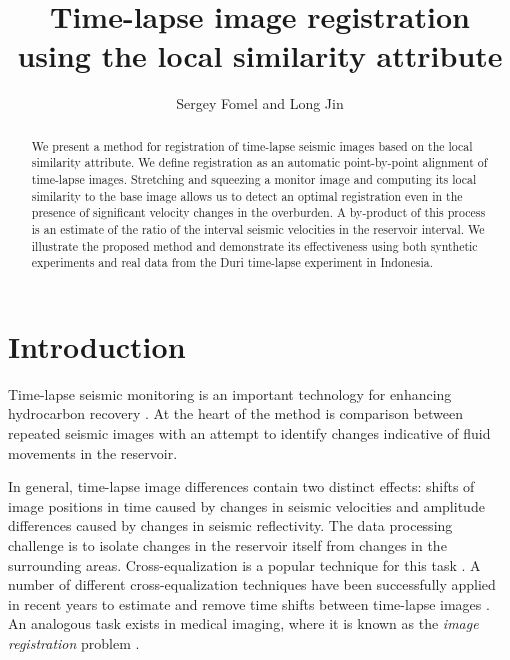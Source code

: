 \title{Time-lapse image registration using the local similarity attribute}
\author{Sergey Fomel and Long Jin}


\address{
John A. and Katherine G. Jackson School of Geosciences \\
The University of Texas at Austin \\
University Station, Box X \\
Austin, TX 78713-8924}


\maketitle

\begin{abstract}
  We present a method for registration of time-lapse seismic images
  based on the local similarity attribute. We define registration as
  an automatic point-by-point alignment of time-lapse images.
  Stretching and squeezing a monitor image and computing its local
  similarity to the base image allows us to detect an optimal
  registration even in the presence of significant velocity changes in
  the overburden.  A by-product of this process is an estimate of the
  ratio of the interval seismic velocities in the reservoir
  interval. We illustrate the proposed method and demonstrate its
  effectiveness using both synthetic experiments and real data from
  the Duri time-lapse experiment in Indonesia.
\end{abstract}

\section{Introduction}
Time-lapse seismic monitoring is an important technology for enhancing
hydrocarbon recovery \cite[]{GEO66-01-00500053}. At the heart of the
method is comparison between repeated seismic images with an attempt
to identify changes indicative of fluid movements in the reservoir.

In general, time-lapse image differences contain two distinct effects:
shifts of image positions in time caused by changes in seismic
velocities and amplitude differences caused by changes in seismic
reflectivity. The data processing challenge is to isolate changes in
the reservoir itself from changes in the surrounding
areas. Cross-equalization is a popular technique for this task
\cite[]{GEO66-04-10151025,stucchi}.  A number of different
cross-equalization techniques have been successfully applied in recent
years to estimate and remove time shifts between 
time-lapse images \cite[]{bertrand,aarre}. An analogous task 
exists in medical imaging, where it is known as the \emph{image
registration} problem \cite[]{medical}.

